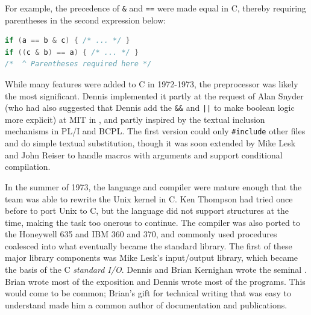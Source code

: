 For example, the precedence of \texttt{\&} and \texttt{==} were made equal in C,
thereby requiring parentheses in the second expression below:

\begin{lstlisting}[language=c,frame=single]
if (a == b & c) { /* ... */ }
if ((c & b) == a) { /* ... */ }
/*  ^ Parentheses required here */
\end{lstlisting}

While many features were added to C in 1972-1973, the preprocessor was likely the most
significant. Dennis implemented it partly at the request of Alan Snyder
(who had also suggested that Dennis add the \texttt{\&\&} and \texttt{||} to make
boolean logic more explicit) at MIT
in , and
partly inspired by the textual inclusion mechanisms in PL/I and BCPL.
The first version could only \texttt{\#include} other files and do simple textual
substitution, though it was soon extended by Mike Lesk and John Reiser to handle macros
with arguments and support conditional compilation.

In the summer of 1973, the language and compiler were mature enough that the team was able
to rewrite the Unix kernel in C.
Ken Thompson had tried once before to port Unix to C, but the language did not support
structures at the time, making the task too onerous to continue.
The compiler was also ported to the Honeywell 635 and IBM 360 and 370, and commonly used
procedures coalesced into what eventually became the standard library.
The first of these major library components was Mike Lesk's input/output library, which
became the basis of the C \textit{standard I/O}.
Dennis and Brian Kernighan wrote the seminal .
Brian wrote most of the exposition and Dennis wrote most of the programs.
This would come to be common; Brian's gift for technical writing that was easy to understand
made him a common author of documentation and publications.

